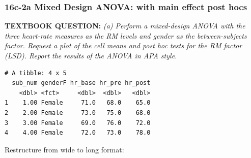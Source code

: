 \documentclass[]{article}
\newenvironment{Shaded}{\begin{snugshade}}{\end{snugshade}}
\newcommand{\KeywordTok}[1]{\textcolor[rgb]{0.13,0.29,0.53}{\textbf{#1}}}
\newcommand{\DataTypeTok}[1]{\textcolor[rgb]{0.13,0.29,0.53}{#1}}
\newcommand{\DecValTok}[1]{\textcolor[rgb]{0.00,0.00,0.81}{#1}}
\newcommand{\StringTok}[1]{\textcolor[rgb]{0.31,0.60,0.02}{#1}}
\newcommand{\CommentTok}[1]{\textcolor[rgb]{0.56,0.35,0.01}{\textit{#1}}}
\newcommand{\OperatorTok}[1]{\textcolor[rgb]{0.81,0.36,0.00}{\textbf{#1}}}
\newcommand{\NormalTok}[1]{#1}
\begin{document}
\subsubsection{16c-2a Mixed Design ANOVA: with main effect post
hocs}\label{c-2a-mixed-design-anova-with-main-effect-post-hocs}

\textbf{TEXTBOOK QUESTION:} \emph{(a) Perform a mixed-design ANOVA with
the three heart-rate measures as the RM levels and gender as the
between-subjects factor. Request a plot of the cell means and post hoc
tests for the RM factor (LSD). Report the results of the ANOVA in APA
style.}

\begin{Shaded}
\end{Shaded}

\begin{verbatim}
# A tibble: 4 x 5
  sub_num genderF hr_base hr_pre hr_post
    <dbl> <fct>     <dbl>  <dbl>   <dbl>
1    1.00 Female     71.0   68.0    65.0
2    2.00 Female     73.0   75.0    68.0
3    3.00 Female     69.0   76.0    72.0
4    4.00 Female     72.0   73.0    78.0
\end{verbatim}

Restructure from wide to long format:

\begin{Shaded}
\end{Shaded}
\end{document}
